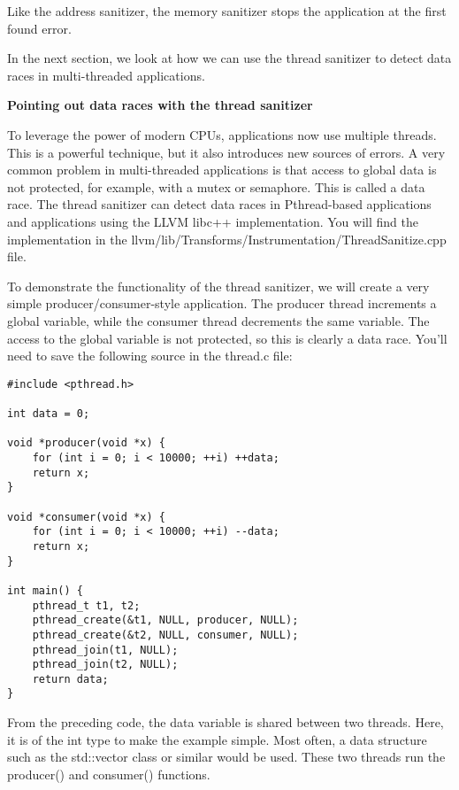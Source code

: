 Like the address sanitizer, the memory sanitizer stops the application at the first found error.\par

In the next section, we look at how we can use the thread sanitizer to detect data races in multi-threaded applications.\par

\hspace*{\fill} \par %
\textbf{Pointing out data races with the thread sanitizer}

To leverage the power of modern CPUs, applications now use multiple threads. This is a powerful technique, but it also introduces new sources of errors. A very common problem in multi-threaded applications is that access to global data is not protected, for example, with a mutex or semaphore. This is called a data race. The thread sanitizer can detect data races in Pthread-based applications and applications using the LLVM libc++ implementation. You will find the implementation in the llvm/lib/Transforms/Instrumentation/ThreadSanitize.cpp file.\par

To demonstrate the functionality of the thread sanitizer, we will create a very simple producer/consumer-style application. The producer thread increments a global variable, while the consumer thread decrements the same variable. The access to the global variable is not protected, so this is clearly a data race. You'll need to save the following source in the thread.c file:\par

\begin{lstlisting}[caption={}]
#include <pthread.h>

int data = 0;

void *producer(void *x) {
	for (int i = 0; i < 10000; ++i) ++data;
	return x;
}

void *consumer(void *x) {
	for (int i = 0; i < 10000; ++i) --data;
	return x;
}

int main() {
	pthread_t t1, t2;
	pthread_create(&t1, NULL, producer, NULL);
	pthread_create(&t2, NULL, consumer, NULL);
	pthread_join(t1, NULL);
	pthread_join(t2, NULL);
	return data;
}
\end{lstlisting}

From the preceding code, the data variable is shared between two threads. Here, it is of the int type to make the example simple. Most often, a data structure such as the std::vector class or similar would be used. These two threads run the producer() and consumer() functions.\par

